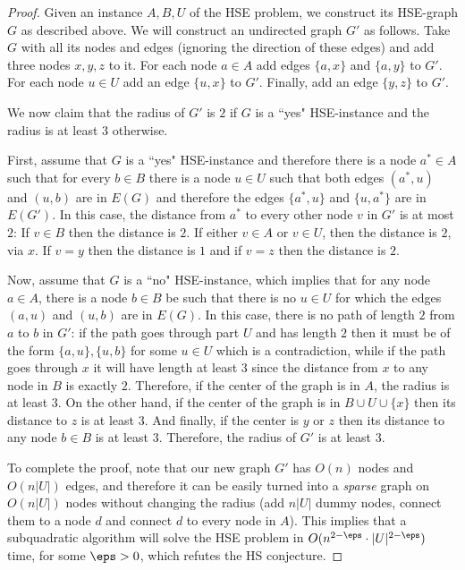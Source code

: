 \begin{proof}
Given an instance $A,B,U$ of the HSE problem, we construct its HSE-graph $G$ as described above.
We will construct an undirected graph $G'$ as follows.
Take $G$ with all its nodes and edges (ignoring the direction of these edges) and add three nodes $x,y,z$ to it.
For each node $a \in A$ add edges $\{a,x\}$ and $\{a,y\}$ to $G'$.
For each node $u \in U$ add an edge $\{u,x\}$ to $G'$.
Finally, add an edge $\{y,z\}$ to $G'$.

We now claim that the radius of $G'$ is $2$ if $G$ is a ``yes" HSE-instance and the radius is at least $3$ otherwise.

First, assume that $G$ is a ``yes" HSE-instance and therefore there is a node $a^*\in A$ such that for every $b \in B$ there is a node $u \in U$ such that both edges $(a^*,u)$ and $(u,b)$ are in $E(G)$ and therefore the edges $\{a^*,u\}$ and $\{u,a^*\}$ are in $E(G')$.
In this case, the distance from $a^*$ to every other node $v$ in $G'$ is at most $2$:
If $v \in B$ then the distance is $2$.
If either $v \in A$ or $v\in U$, then the distance is $2$, via $x$.
If $v=y$ then the distance is $1$ and if $v=z$ then the distance is $2$.

Now, assume that $G$ is a ``no" HSE-instance, which implies that for any node $a\in A$, there is a node $b \in B$ be such that there is no $u \in U$ for which the edges $(a,u)$ and $(u,b)$ are in $E(G)$. 
In this case, there is no path of length $2$ from $a$ to $b$ in $G'$: if the path goes through part $U$ and has length $2$ then it must be of the form $\{a,u\}, \{u,b\}$ for some $u \in U$ which is a contradiction, while if the path goes through $x$ it will have length at least $3$ since the distance from $x$ to any node in $B$ is exactly $2$.
Therefore, if the center of the graph is in $A$, the radius is at least $3$.
On the other hand, if the center of the graph is in $B \cup U \cup \{x\}$ then its distance to $z$ is at least $3$. 
And finally, if the center is $y$ or $z$ then its distance to any node $b \in B$ is at least $3$.
Therefore, the radius of $G'$ is at least $3$.

To complete the proof, note that our new graph $G'$ has $O(n)$ nodes and $O(n |U|)$ edges, and therefore it can be easily turned into a \emph{sparse} graph on $O(n|U|)$ nodes without changing the radius (add $n|U|$ dummy nodes, connect them to a node $d$ and connect $d$ to every node in $A$). This implies that a subquadratic algorithm will solve the HSE problem in $O(n^{2-\eps} \cdot |U|^{2-\eps})$ time, for some $\eps>0$, which refutes the HS conjecture. 

\end{proof}

